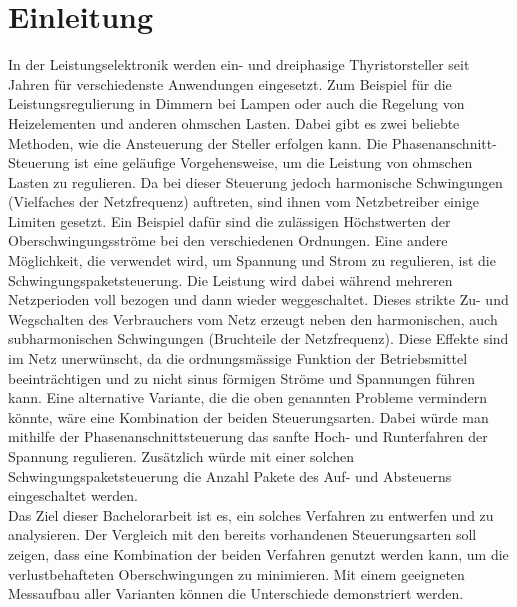 \section{Einleitung}











In der Leistungselektronik werden ein- und dreiphasige Thyristorsteller seit Jahren für verschiedenste Anwendungen eingesetzt. Zum Beispiel für die Leistungsregulierung in Dimmern bei Lampen oder auch die Regelung von Heizelementen und anderen ohmschen Lasten. Dabei gibt es zwei beliebte Methoden, wie die Ansteuerung der Steller erfolgen kann. Die Phasenanschnitt-Steuerung ist eine geläufige Vorgehensweise, um die Leistung von ohmschen Lasten zu regulieren. Da bei dieser Steuerung jedoch harmonische Schwingungen (Vielfaches der Netzfrequenz) auftreten, sind ihnen vom Netzbetreiber einige Limiten gesetzt. Ein Beispiel dafür sind die zulässigen Höchstwerten der Oberschwingungsströme bei den verschiedenen Ordnungen. Eine andere Möglichkeit, die verwendet wird, um Spannung und Strom zu regulieren, ist die Schwingungspaketsteuerung. Die Leistung wird dabei während mehreren Netzperioden voll bezogen und dann wieder weggeschaltet. Dieses strikte Zu- und Wegschalten des Verbrauchers vom Netz erzeugt neben den harmonischen, auch subharmonischen Schwingungen (Bruchteile der Netzfrequenz). Diese Effekte sind im Netz unerwünscht, da die ordnungsmässige Funktion der Betriebsmittel beeinträchtigen und zu nicht sinus förmigen Ströme und Spannungen führen kann.
Eine alternative Variante, die die oben genannten Probleme vermindern könnte, wäre eine Kombination der beiden Steuerungsarten. Dabei würde man mithilfe der Phasenanschnittsteuerung das sanfte Hoch- und Runterfahren der Spannung regulieren. Zusätzlich würde mit einer solchen Schwingungspaketsteuerung die Anzahl Pakete des Auf- und Absteuerns eingeschaltet werden.\\
Das Ziel dieser Bachelorarbeit ist es, ein solches Verfahren zu entwerfen und zu analysieren. Der Vergleich mit den bereits vorhandenen Steuerungsarten soll zeigen, dass eine Kombination der beiden Verfahren genutzt werden kann, um die verlustbehafteten Oberschwingungen zu minimieren. Mit einem geeigneten Messaufbau aller Varianten können die Unterschiede demonstriert werden.\\
